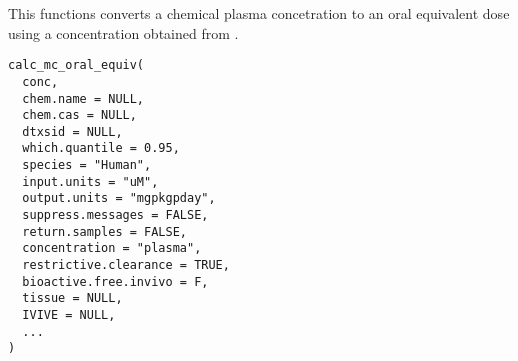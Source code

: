 \documentclass[a4paper]{book}
\begin{document}
%
\begin{Description}\relax
This functions converts a chemical plasma concetration to an oral equivalent
dose using a concentration obtained from .
\end{Description}
%
\begin{Usage}
\begin{verbatim}
calc_mc_oral_equiv(
  conc,
  chem.name = NULL,
  chem.cas = NULL,
  dtxsid = NULL,
  which.quantile = 0.95,
  species = "Human",
  input.units = "uM",
  output.units = "mgpkgpday",
  suppress.messages = FALSE,
  return.samples = FALSE,
  concentration = "plasma",
  restrictive.clearance = TRUE,
  bioactive.free.invivo = F,
  tissue = NULL,
  IVIVE = NULL,
  ...
)
\end{verbatim}
\end{Usage}
%
\end{document}
